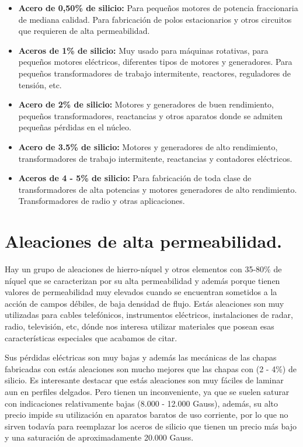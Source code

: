 \documentclass[12pt,a4paper]{article}
\begin{document}
\begin{itemize}
    \item \textbf{Acero de 0,50\% de silicio:}
    Para pequeños motores de potencia fraccionaria de mediana calidad. Para fabricación de polos estacionarios y otros circuitos que requieren de alta permeabilidad.
    \item \textbf{Aceros de 1\% de silicio:}
    Muy usado para máquinas rotativas, para pequeños motores eléctricos, diferentes tipos de motores y generadores. Para pequeños transformadores de trabajo intermitente, reactores, reguladores de tensión, etc.
    \item \textbf{Acero de 2\% de silicio:}
    Motores y generadores de buen rendimiento, pequeños transformadores, reactancias y otros aparatos donde se admiten pequeñas pérdidas en el núcleo.
    \item \textbf{Acero de 3.5\% de silicio:}
    Motores y generadores de alto rendimiento, transformadores de trabajo intermitente, reactancias y contadores eléctricos.
    \item \textbf{Aceros de 4 - 5\% de silicio:}
    Para fabricación de toda clase de transformadores de alta potencias y motores generadores de alto rendimiento. Transformadores de radio y otras aplicaciones.
\end{itemize}

\section{Aleaciones de alta permeabilidad.}

Hay un grupo de aleaciones de hierro-níquel y otros elementos con 35-80\% de níquel que se caracterizan por su alta permeabilidad y además porque tienen valores de permeabilidad muy elevados cuando se encuentran sometidos a la acción de campos débiles, de baja densidad de flujo. Estás aleaciones son muy utilizadas para cables telefónicos, instrumentos eléctricos, instalaciones de radar, radio, televisión, etc, dónde nos interesa utilizar materiales que posean esas características especiales que acabamos de citar.

Sus pérdidas eléctricas son muy bajas y además las mecánicas de las chapas fabricadas con estás aleaciones son mucho mejores que las chapas con (2 - 4\%) de silicio. Es interesante destacar que estás aleaciones son muy fáciles de laminar aun en perfiles delgados. Pero tienen un inconveniente, ya que se suelen saturar con indicaciones relativamente bajas (8.000 - 12.000 Gauss), además, su alto precio impide su utilización en aparatos baratos de uso corriente, por lo que no sirven todavía para reemplazar los aceros de silicio que tienen un precio más bajo y una saturación de aproximadamente 20.000 Gauss.
\end{document}
